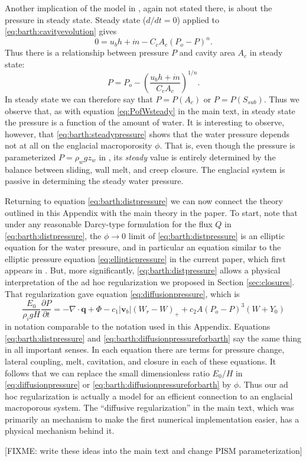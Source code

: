 \documentclass[11pt,final]{amsart}%
\newcommand\bv{\mathbf{v}}
\newcommand\bq{\mathbf{q}}
\newcommand{\Div}{\nabla\cdot}
\begin{document}
Another implication of the model in \cite{Bartholomausetal2011}, again not stated there, is about the pressure in steady state.  Steady state ($d/dt = 0$) applied to \eqref{eq:barth:cavityevolution} gives
\begin{equation*}
0 = u_b h + \dot m - C_c A_c (P_o-P)^n.
\end{equation*}
Thus there is a relationship between pressure $P$ and cavity area $A_c$ in steady state:
\begin{equation}
P = P_o - \left(\frac{u_b h + \dot m}{C_c A_c}\right)^{1/n}. \label{eq:barth:steadypressure}
\end{equation}
In steady state we can therefore say that $P=P(A_c)$ or $P=P(S_{sub})$.  Thus we observe that, as with equation \eqref{eq:PofWsteady} in the main text, in steady state the pressure is a function of the amount of water.  It is interesting to observe, however, that \eqref{eq:barth:steadypressure} shows that the water pressure depends not at all on the englacial macroporosity $\phi$.  That is, even though the pressure is parameterized $P=\rho_w g z_w$ in \cite{Bartholomausetal2011}, its \emph{steady} value is entirely determined by the balance between sliding, wall melt, and creep closure.  The englacial system is passive in determining the steady water pressure.

Returning to equation \eqref{eq:barth:distpressure} we can now connect the theory outlined in this Appendix with the main theory in the paper.  To start, note that under any reasonable Darcy-type formulation for the flux $Q$ in \eqref{eq:barth:distpressure}, the $\phi\to 0$ limit of \eqref{eq:barth:distpressure} is an elliptic equation for the water pressure, and in particular an equation similar to the elliptic pressure equation \eqref{eq:ellipticpressure} in the current paper, which first appears in \cite{Schoofetal2012}.  But, more significantly, \eqref{eq:barth:distpressure} allows a physical interpretation of the ad hoc regularization we proposed in Section \ref{sec:closures}.  That regularization gave equation \eqref{eq:diffusionpressure}, which is
\begin{equation}
\frac{E_0}{\rho_i g H} \frac{\partial P}{\partial t} = - \Div \bq + \Phi - c_1 |\bv_b| (W_r - W)_+  + c_2 A (P_o - P)^3 (W+Y_0) \label{eq:barth:diffusionpressureforbarth}
\end{equation}
in notation comparable to the notation used in this Appendix.  Equations \eqref{eq:barth:distpressure} and \eqref{eq:barth:diffusionpressureforbarth} say the same thing in all important senses.  In each equation there are terms for pressure change, lateral coupling, melt, cavitation, and closure in each of these equations.  It follows that we can replace the small dimensionless ratio $E_0/H$ in \eqref{eq:diffusionpressure} or \eqref{eq:barth:diffusionpressureforbarth} by $\phi$.  Thus our ad hoc regularization is actually a model for an efficient connection to an englacial macroporous system.  The ``diffusive regularization'' in the main text, which was primarily an mechanism to make the first numerical implementation easier, has a physical mechanism behind it.

[FIXME: write these ideas into the main text and change PISM parameterization]
\end{document}
